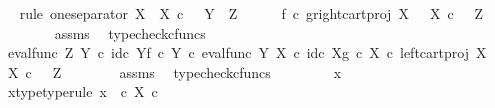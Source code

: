 \begin{isabellebody}
\ \ \isamarkupfalse%
{\isacharparenleft}{\kern0pt}rule\ one{\isacharunderscore}{\kern0pt}separator{\isacharbrackleft}{\kern0pt}\ X\ {\isacharequal}{\kern0pt}\ {\isachardoublequoteopen}X\ {\isasymtimes}\isactrlsub c\ {\isasymone}{\isachardoublequoteclose}{\isacharcomma}{\kern0pt}\ \ Y\ {\isacharequal}{\kern0pt}\ Z{\isacharbrackright}{\kern0pt}{\isacharparenright}{\kern0pt}\isanewline
\ \ \ \ \isamarkupfalse%
\ {\isachardoublequoteopen}f\isactrlsup {\isasymflat}\ {\isasymcirc}\isactrlsub c\ {\isasymlangle}g\isactrlsup {\isasymflat}{\isacharcomma}{\kern0pt}right{\isacharunderscore}{\kern0pt}cart{\isacharunderscore}{\kern0pt}proj\ X\ {\isasymone}{\isasymrangle}\ {\isacharcolon}{\kern0pt}\ X\ {\isasymtimes}\isactrlsub c\ {\isasymone}\ {\isasymrightarrow}\ Z{\isachardoublequoteclose}\isanewline
\ \ \ \ \ \ \isamarkupfalse%
\ assms\ \isamarkupfalse%
\ typecheck{\isacharunderscore}{\kern0pt}cfuncs\isanewline
\ \ \ \ \isamarkupfalse%
\ {\isachardoublequoteopen}{\isacharparenleft}{\kern0pt}{\isacharparenleft}{\kern0pt}eval{\isacharunderscore}{\kern0pt}func\ Z\ Y\ {\isasymcirc}\isactrlsub c\ {\isasymlangle}id\isactrlsub c\ Y{\isacharcomma}{\kern0pt}f\ {\isasymcirc}\isactrlsub c\ {\isasymbeta}\isactrlbsub Y\isactrlesub {\isasymrangle}{\isacharparenright}{\kern0pt}\ {\isasymcirc}\isactrlsub c\ eval{\isacharunderscore}{\kern0pt}func\ Y\ X\ {\isasymcirc}\isactrlsub c\ {\isasymlangle}id\isactrlsub c\ X{\isacharcomma}{\kern0pt}g\ {\isasymcirc}\isactrlsub c\ {\isasymbeta}\isactrlbsub X\isactrlesub {\isasymrangle}{\isacharparenright}{\kern0pt}\ {\isasymcirc}\isactrlsub c\ left{\isacharunderscore}{\kern0pt}cart{\isacharunderscore}{\kern0pt}proj\ X\ {\isasymone}\ {\isacharcolon}{\kern0pt}\ X\ {\isasymtimes}\isactrlsub c\ {\isasymone}\ {\isasymrightarrow}\ Z{\isachardoublequoteclose}\isanewline
\ \ \ \ \ \ \isamarkupfalse%
\ assms\ \isamarkupfalse%
\ typecheck{\isacharunderscore}{\kern0pt}cfuncs\isanewline
\ \ \isamarkupfalse%
\isanewline
\ \ \ \ \isamarkupfalse%
\ x{}\ \isanewline
\ \ \ \ \isamarkupfalse%
\ x{}{\isacharunderscore}{\kern0pt}type{\isacharbrackleft}{\kern0pt}type{\isacharunderscore}{\kern0pt}rule{\isacharbrackright}{\kern0pt}{\isacharcolon}{\kern0pt}\ {\isachardoublequoteopen}x{}\ \ {\isasymin}\isactrlsub c\ {\isacharparenleft}{\kern0pt}X\ {\isasymtimes}\isactrlsub c\ {\isasymone}{\isacharparenright}{\kern0pt}{\isachardoublequoteclose}\isanewline

\end{isabellebody}
